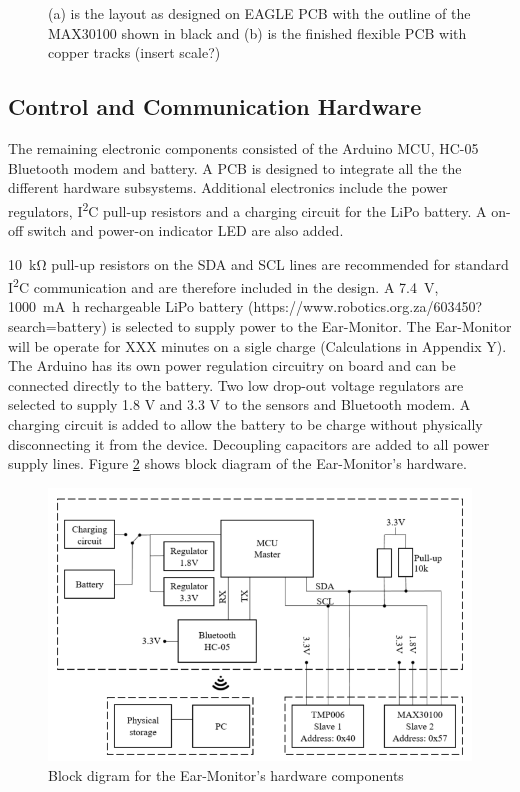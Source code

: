 \begin{figure}[H]
\centering
\graphicspath{{figs/}}
\def\svgwidth{180pt}

\caption{(a) is the layout as designed on EAGLE PCB  with the outline of the MAX30100 shown in black and (b) is the finished flexible PCB with copper tracks (insert scale?)}
\label{fig:MAX30100_layout}
\end{figure}

\subsection{Control and Communication Hardware}
The remaining electronic components consisted of the Arduino MCU, HC-05 Bluetooth modem and battery. A PCB is designed to integrate all the the different hardware subsystems. Additional electronics include the power regulators, I\textsuperscript{2}C pull-up resistors and a charging circuit for the LiPo battery. A on-off switch and power-on indicator LED are also added. 

\medskip

\SI{10}{\kilo\ohm} pull-up resistors on the SDA and SCL lines are recommended for standard I\textsuperscript{2}C communication and are therefore included in the design. A \SI{7.4}{\volt}, \SI{1000}{\milli\ampere\hour} rechargeable LiPo battery (https://www.robotics.org.za/603450?search=battery) is selected to supply power to the Ear-Monitor. The Ear-Monitor will be operate for XXX minutes on a sigle charge (Calculations in Appendix Y). The Arduino has its own power regulation circuitry on board and can be connected directly to the battery. Two low drop-out voltage regulators are selected to supply 1.8 V and 3.3 V to the sensors and Bluetooth modem. A charging circuit is added to allow the battery to be charge without physically disconnecting it from the device. Decoupling capacitors are added to all power supply lines. Figure \ref{fig:Ear-Monitor_BlockDiagram} shows block diagram of the Ear-Monitor's hardware.

\begin{figure}[H]
   \centering
   \includegraphics[scale=0.9]{figs/Ear-Monitor_BlockDiagram.png}
   \caption{Block digram for the Ear-Monitor's hardware components}
   \label{fig:Ear-Monitor_BlockDiagram}
\end{figure}

